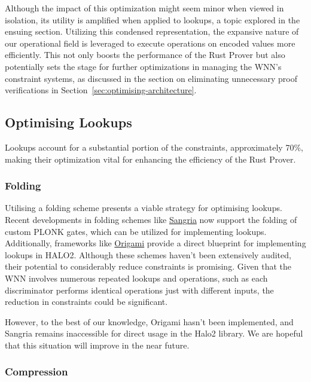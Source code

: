 \documentclass{article}[12pt]
\begin{document}
Although the impact of this optimization might seem minor when viewed in isolation, its utility is amplified when applied to lookups, a topic explored in the ensuing section.
Utilizing this condensed representation, the expansive nature of our operational field is leveraged to execute operations on encoded values more efficiently.
This not only boosts the performance of the Rust Prover but also potentially sets the stage for further optimizations in managing the WNN's constraint systems, as discussed in the section on eliminating unnecessary proof verifications in Section~\ref{sec:optimising-architecture}.



\subsection{Optimising Lookups}\label{subsec:lookups-optimisation}

Lookups account for a substantial portion of the constraints, approximately 70\%, making their optimization vital for enhancing the efficiency of the Rust Prover.

\subsubsection{Folding}\label{subsubsec:folding}

Utilising a folding scheme presents a viable strategy for optimising lookups.
Recent developments in folding schemes like \href{https://geometry.xyz/notebook/sangria-a-folding-scheme-for-plonk}{Sangria} now support the folding of custom PLONK gates, which can be utilized for implementing lookups.
Additionally, frameworks like \href{https://hackmd.io/@aardvark/rkHqa3NZ2}{Origami} provide a direct blueprint for implementing lookups in HALO2. Although these schemes haven't been extensively audited, their potential to considerably reduce constraints is promising.
Given that the WNN involves numerous repeated lookups and operations, such as each discriminator performs identical operations just with different inputs, the reduction in constraints could be significant.

However, to the best of our knowledge, Origami hasn't been implemented, and Sangria remains inaccessible for direct usage in the Halo2 library.
We are hopeful that this situation will improve in the near future.

\subsubsection{Compression}\label{subsubsec:compression}
\end{document}
